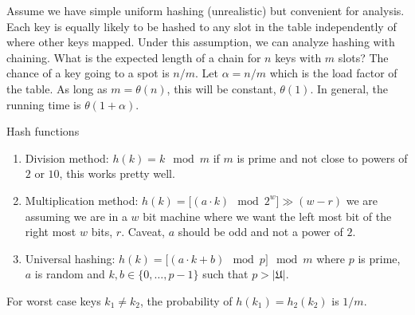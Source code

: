 Assume we have simple uniform hashing (unrealistic) but convenient for analysis. Each key is equally likely
to be hashed to any slot in the table independently of where other keys mapped. Under this assumption, we
can analyze hashing with chaining. What is the expected length of a chain for \(n\) keys with \(m\) slots?
The chance of a key going to a spot is \(n / m\). Let \(\alpha = n / m\) which is the load factor of the table.
As long as \(m = \theta(n)\), this will be constant, \(\theta(1)\). In general, the running time is 
\(\theta(1 + \alpha)\). 

Hash functions
\begin{enumerate}
	\item Division method: \(h(k) = k \mod m\) if \(m\) is prime and not close to powers of \(2\) or \(10\), this
	works pretty well.
	\item Multiplication method: \(h(k) = \Big[(a\cdot k) \mod 2^w\Big] \gg (w - r)\) we are assuming we are in a 
	\(w\) bit machine where we want the left most bit of the right most \(w\) bits, \(r\). Caveat, \(a\) should be
	odd and not a power of \(2\).
	\item Universal hashing: \(h(k) = \Big[(a\cdot k + b) \mod p\Big] \mod m\) where \(p\) is prime, \(a\) is 
	random and \(k,b\in\{0,\ldots, p - 1\}\) such that \(p > \lvert\mathfrak{U}\rvert\).
\end{enumerate}
For worst case keys \(k_1\neq k_2\), the probability of \(h(k_1) = h_2(k_2)\) is \(1 / m\).



